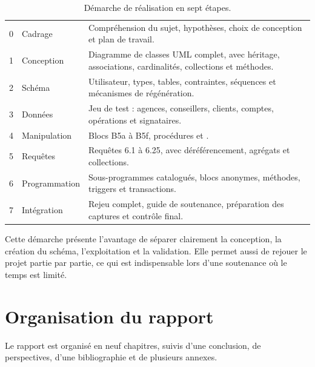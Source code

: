 \begin{table}[htbp]
  \centering
  \small
  \caption{Démarche de réalisation en sept étapes.}
  \label{tab:demarche}
  \begin{tabularx}{\textwidth}{@{}C{0.8cm}L{3.2cm}X@{}}
    \toprule
    \entete{\#} &  &  \\
     & Cadrage & Compréhension du sujet, hypothèses, choix de conception et plan de travail. \\
    1 & Conception & Diagramme de classes UML complet, avec héritage, associations, cardinalités, collections et méthodes. \\
    2 & Schéma & Utilisateur, types, tables, contraintes, séquences et mécanismes de régénération. \\
    3 & Données & Jeu de test : agences, conseillers, clients, comptes, opérations et signataires. \\
    4 & Manipulation & Blocs B5a à B5f, procédures  et . \\
    5 & Requêtes & Requêtes 6.1 à 6.25, avec déréférencement, agrégats et collections. \\
    6 & Programmation & Sous-programmes catalogués, blocs anonymes, méthodes, triggers et transactions. \\
    7 & Intégration & Rejeu complet, guide de soutenance, préparation des captures et contrôle final. \\
    \bottomrule
  \end{tabularx}
\end{table}

Cette démarche présente l'avantage de séparer clairement la conception, la
création du schéma, l'exploitation et la validation. Elle permet aussi de
rejouer le projet partie par partie, ce qui est indispensable lors d'une
soutenance où le temps est limité.

\section{Organisation du rapport}

Le rapport est organisé en neuf chapitres, suivis d'une conclusion, de
perspectives, d'une bibliographie et de plusieurs annexes.

